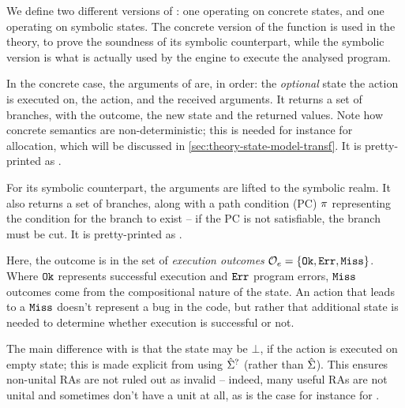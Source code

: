We define two different versions of \execac{}: one operating on concrete states, and one operating on symbolic states. The concrete version of the function is used in the theory, to prove the soundness of its symbolic counterpart, while the symbolic version is what is actually used by the engine to execute the analysed program.

In the concrete case, the arguments of \execac{} are, in order: the \emph{optional} state the action is executed on, the action, and the received arguments. It returns a set of branches, with the outcome, the new state and the returned values. Note how concrete semantics are non-deterministic; this is needed for instance for allocation, which will be discussed in \cref{sec:theory-state-model-transf}. It is pretty-printed as .

For its symbolic counterpart, the arguments are lifted to the symbolic realm. It also returns a set of branches, along with a path condition (PC) $\pi$ representing the condition for the branch to exist -- if the PC is not satisfiable, the branch must be cut. It is pretty-printed as .

Here, the outcome is in the set of \emph{execution outcomes} ${\cal O}_e=\{ \texttt{Ok},\texttt{Err},\texttt{Miss} \}$. Where $\texttt{Ok}$ represents successful execution and $\texttt{Err}$ program errors, $\texttt{Miss}$ outcomes come from the compositional nature of the state. An action that leads to a $\texttt{Miss}$ doesn't represent a bug in the code, but rather that additional state is needed to determine whether execution is successful or not.

The main difference with \cite{cse2} is that the state may be $\bot$, if the action is executed on empty state; this is made explicit from using $\hat{\Sigma}^?$ (rather than $\hat{\Sigma}$). This ensures non-unital RAs are not ruled out as invalid -- indeed, many useful RAs are not unital and sometimes don't have a unit at all, as is the case for instance for \Ex.

